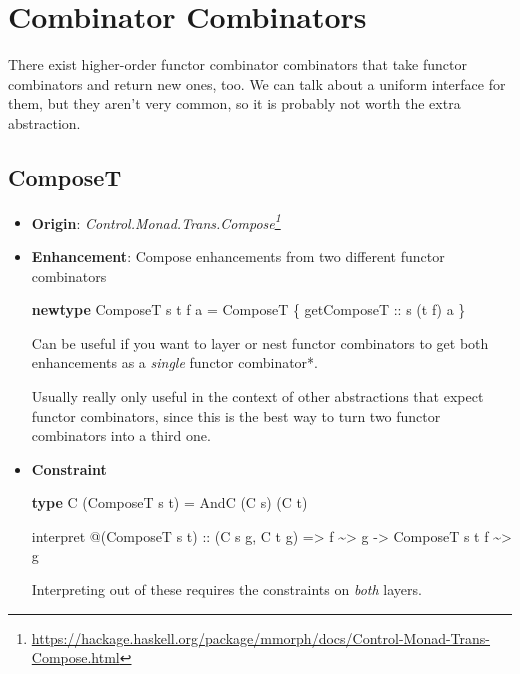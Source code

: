 \documentclass[]{article}
\newenvironment{Shaded}{}{}
\newcommand{\DataTypeTok}[1]{\textcolor[rgb]{0.56,0.13,0.00}{#1}}
\newcommand{\KeywordTok}[1]{\textcolor[rgb]{0.00,0.44,0.13}{\textbf{#1}}}
\newcommand{\NormalTok}[1]{#1}
\newcommand{\OperatorTok}[1]{\textcolor[rgb]{0.40,0.40,0.40}{#1}}
\newcommand{\OtherTok}[1]{\textcolor[rgb]{0.00,0.44,0.13}{#1}}
\renewcommand{\href}[2]{#2\footnote{\url{#1}}}
\begin{document}
\hypertarget{combinator-combinators}{%
\section{Combinator Combinators}\label{combinator-combinators}}

There exist higher-order functor combinator combinators that take functor
combinators and return new ones, too. We can talk about a uniform interface for
them, but they aren't very common, so it is probably not worth the extra
abstraction.

\hypertarget{composet}{%
\subsection{ComposeT}\label{composet}}

\begin{itemize}
\item
  \textbf{Origin}:
  \emph{\href{https://hackage.haskell.org/package/mmorph/docs/Control-Monad-Trans-Compose.html}{Control.Monad.Trans.Compose}}
\item
  \textbf{Enhancement}: Compose enhancements from two different functor
  combinators

\begin{Shaded}
\begin{Highlighting}[]
\KeywordTok{newtype} \DataTypeTok{ComposeT}\NormalTok{ s t f a }\OtherTok{=} \DataTypeTok{ComposeT}\NormalTok{ \{}\OtherTok{ getComposeT ::}\NormalTok{ s (t f) a \}}
\end{Highlighting}
\end{Shaded}

  Can be useful if you want to layer or nest functor combinators to get both
  enhancements as a \emph{single} functor combinator*.

  Usually really only useful in the context of other abstractions that expect
  functor combinators, since this is the best way to turn two functor
  combinators into a third one.
\item
  \textbf{Constraint}

\begin{Shaded}
\begin{Highlighting}[]
\KeywordTok{type} \DataTypeTok{C}\NormalTok{ (}\DataTypeTok{ComposeT}\NormalTok{ s t) }\OtherTok{=} \DataTypeTok{AndC}\NormalTok{ (}\DataTypeTok{C}\NormalTok{ s) (}\DataTypeTok{C}\NormalTok{ t)}

\NormalTok{interpret }\OperatorTok{@}\NormalTok{(}\DataTypeTok{ComposeT}\NormalTok{ s t)}
\OtherTok{    ::}\NormalTok{ (}\DataTypeTok{C}\NormalTok{ s g, }\DataTypeTok{C}\NormalTok{ t g)}
    \OtherTok{=>}\NormalTok{ f }\OperatorTok{\textasciitilde{}>}\NormalTok{ g}
    \OtherTok{{-}>} \DataTypeTok{ComposeT}\NormalTok{ s t f }\OperatorTok{\textasciitilde{}>}\NormalTok{ g}
\end{Highlighting}
\end{Shaded}

  Interpreting out of these requires the constraints on \emph{both} layers.
\end{itemize}
\end{document}
